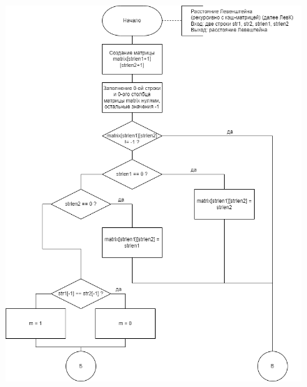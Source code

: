 \documentclass[12pt, a4paper]{report}
\begin{document}
\begin{figure}[H]
\includegraphics[scale=0.72]{mat1.png}
\end{figure}
\end{document}

